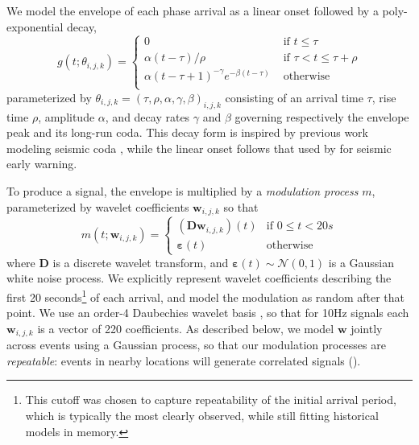\documentclass[twoside]{article} \usepackage{aistats2017}
\newcommand{\N}{\mathcal{N}}
\renewcommand{\v}[1]{\mathbf{#1}}
\newcommand{\ve}{\v{\varepsilon}}
\begin{document}
We model the envelope of each phase
arrival as a linear onset followed by a poly-exponential decay, 
\begin{equation*}g(t; \theta_{i,j,k}) = \left\{\begin{array}{ll}
0 & \text{ if } t \le \tau\\
\alpha (t-\tau) / \rho & \text{ if } \tau < t \le \tau+\rho\\
\alpha (t-\tau+1)^{-\gamma} e^{-\beta (t-\tau)} &\text{ otherwise}\\
\end{array}\right.\end{equation*}
parameterized by $\theta_{i,j,k} = (\tau, \rho, \alpha, \gamma,
\beta)_{i,j,k}$ consisting of an arrival time $\tau$, rise time $\rho$, amplitude
$\alpha$, and decay rates $\gamma$ and $\beta$ governing respectively
the envelope peak and its long-run coda. This decay form is inspired by previous work modeling seismic
coda \citep{mayeda2003stable}, while the linear
onset follows that used by 
\citet{cua2005creating} for seismic early warning. 

To produce a signal, the envelope is multiplied by a {\em modulation process} $m$, parameterized
by wavelet coefficients $\v{w}_{i,j,k}$ so that
\begin{equation*}
m(t; \v{w}_{i,j,k}) = \left\{\begin{array}{ll} (\mathbf{D}\v{w}_{i,j,k})(t) & \text{if } 0 \le t <
                                                    20s\\\ve(t) & \text{otherwise}\end{array}\right.\end{equation*}
where $\mathbf{D}$ is a discrete wavelet transform, and
$\ve(t)\sim\N(0, 1)$ is a Gaussian white noise process. We
explicitly represent wavelet coefficients describing the first 20
seconds\footnote{This cutoff was chosen to
  capture repeatability of the initial arrival period, which is
  typically the most clearly observed, while still fitting historical
  models in memory.} of each 
arrival, and model the modulation as random after that point. We use an order-4 Daubechies wavelet
basis \citep{daubechies1992ten}, so that for 10Hz signals each
$\v{w}_{i,j,k}$ is a vector of 220 coefficients.  As described below, we
model $\v{w}$ jointly across events using a Gaussian process, so that
our modulation processes are {\em repeatable}: events in nearby locations
will generate correlated signals (). 
\end{document}
